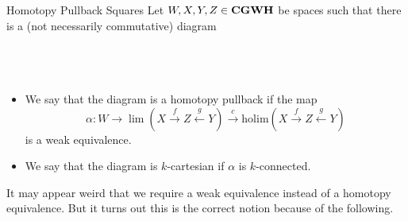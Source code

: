 \documentclass[a4paper]{article}
\begin{document}
\begin{defn}{Homotopy Pullback Squares}{} Let $W,X,Y,Z\in\bold{CGWH}$ be spaces such that there is a (not necessarily commutative) diagram \\~\\
\\~\\
\begin{itemize}
\item We say that the diagram is a homotopy pullback if the map $$\alpha:W\to\lim(X\overset{f}{\rightarrow}Z\overset{g}{\leftarrow}Y)\overset{c}{\longrightarrow}\text{holim}(X\overset{f}{\rightarrow}Z\overset{g}{\leftarrow}Y)$$ is a weak equivalence. 
\item We say that the diagram is $k$-cartesian if $\alpha$ is $k$-connected. 
\end{itemize}
\end{defn}

It may appear weird that we require a weak equivalence instead of a homotopy equivalence. But it turns out this is the correct notion because of the following. 
\end{document}
